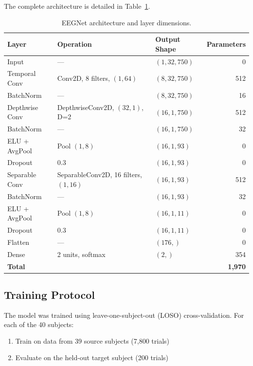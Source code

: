 The complete architecture is detailed in Table~\ref{tab:architecture}.

\begin{table}[htbp]
\centering
\caption{EEGNet architecture and layer dimensions.}
\label{tab:architecture}
\begin{tabular}{@{}lllr@{}}
\toprule
\textbf{Layer} & \textbf{Operation} & \textbf{Output Shape} & \textbf{Parameters} \\
\midrule
Input & — & $(1, 32, 750)$ & 0 \\
Temporal Conv & Conv2D, 8 filters, $(1, 64)$ & $(8, 32, 750)$ & 512 \\
BatchNorm & — & $(8, 32, 750)$ & 16 \\
Depthwise Conv & DepthwiseConv2D, $(32, 1)$, D=2 & $(16, 1, 750)$ & 512 \\
BatchNorm & — & $(16, 1, 750)$ & 32 \\
ELU + AvgPool & Pool $(1, 8)$ & $(16, 1, 93)$ & 0 \\
Dropout & 0.3 & $(16, 1, 93)$ & 0 \\
Separable Conv & SeparableConv2D, 16 filters, $(1, 16)$ & $(16, 1, 93)$ & 512 \\
BatchNorm & — & $(16, 1, 93)$ & 32 \\
ELU + AvgPool & Pool $(1, 8)$ & $(16, 1, 11)$ & 0 \\
Dropout & 0.3 & $(16, 1, 11)$ & 0 \\
Flatten & — & $(176,)$ & 0 \\
Dense & 2 units, softmax & $(2,)$ & 354 \\
\midrule
\textbf{Total} & & & \textbf{1,970} \\
\bottomrule
\end{tabular}
\end{table}


\subsection{Training Protocol}
\label{subsec:methods_training}

The model was trained using leave-one-subject-out (LOSO) cross-validation. For each of the 40 subjects:

\begin{enumerate}
    \item Train on data from 39 source subjects (7,800 trials)
    \item Evaluate on the held-out target subject (200 trials)
\end{enumerate}

